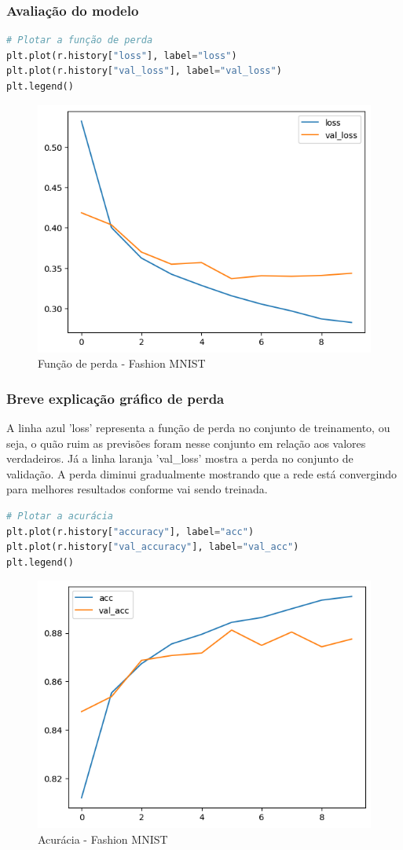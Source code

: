\subsubsection*{Avaliação do modelo}
\begin{lstlisting}[language=Python, style=input]
# Plotar a função de perda
plt.plot(r.history["loss"], label="loss")
plt.plot(r.history["val_loss"], label="val_loss")
plt.legend()
\end{lstlisting}
\begin{figure}[H]
\centering
\includegraphics[width=.8\linewidth]{apendices/fig/13_IAA012_1.png}
\caption{Função de perda - Fashion MNIST}
\end{figure}
\subsubsection*{Breve explicação gráfico de perda}
A linha azul 'loss' representa a função de perda no conjunto de treinamento, ou seja, o quão ruim as previsões foram nesse conjunto em relação aos valores verdadeiros. Já a linha laranja 'val\_loss' mostra a perda no conjunto de validação. A perda diminui gradualmente mostrando que a rede está convergindo para melhores resultados conforme vai sendo treinada.
\begin{lstlisting}[language=Python, style=input]
# Plotar a acurácia
plt.plot(r.history["accuracy"], label="acc")
plt.plot(r.history["val_accuracy"], label="val_acc")
plt.legend()
\end{lstlisting}
\begin{figure}[H]
\centering
\includegraphics[width=.8\linewidth]{apendices/fig/13_IAA012_2.png}
\caption{Acurácia - Fashion MNIST}
\end{figure}
